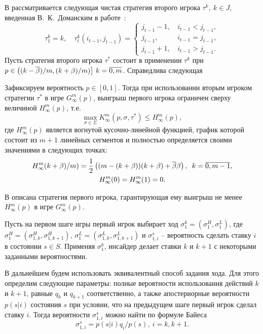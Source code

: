 В  рассматривается следующая чистая стратегия второго игрока $\tau^k,\ k \in J$, введенная В.~К.~Доманским в работе~\cite{domansky07}:
\[
  \tau^k_1 = k, \quad \tau^k_t(i_{t-1}, j_{t-1}) = \begin{cases}
    j_{t-1} - 1, & \, i_{t-1} < j_{t-1}, \\
    j_{t-1},     & \, i_{t-1} = j_{t-1}, \\
    j_{t-1} + 1, & \, i_{t-1} > j_{t-1}.
  \end{cases}
\]
Пусть стратегия второго игрока $\tau^*$ состоит в применении $\tau^k$ при $p \in \left( (k-{\overline{\beta}})/m, (k+\beta)/m) \right]\, k = \overline{0, m}$.
Справедлива следующая
\begin{theorem}
  Зафиксируем вероятность $p \in [0,1]$.
  Тогда при использовании вторым игроком стратегии $\tau^*$ в игре $G^m_\infty(p)$\textup{,} выигрыш первого игрока ограничен сверху величиной $H^m_\infty(p)$, т.е.
  \[
    \max_{\sigma \in \Sigma} K^m_\infty(p,\sigma,\tau^*) \leqslant H^m_\infty(p),
  \]
  где $H^m_\infty(p)$ является вогнутой кусочно-линейной функцией, график которой состоит из $m+1$ линейных сегментов и полностью определяется своими значениями в следующих точках:
  \begin{gather*}
    H^m_\infty(k+\beta)/m) = \frac{1}{2} \left( (m - (k + \beta))(k + \beta) + {\overline{\beta}}\beta \right),\enskip
    k = \overline{0, m - 1},\\
    H^m_\infty(0) = H^m_\infty(1) = 0.
  \end{gather*}
\end{theorem}

В  описана стратегия первого игрока, гарантирующая ему выигрыш не менее $H^m_\infty(p)$ в игре $G^m_\infty(p)$.

Пусть на первом шаге игры первый игрок выбирает ход %
$\sigma^k_1 = (\sigma^H_1, \sigma^L_1)$, где %
$\sigma^H_1 = (\sigma^H_{1,k}, \sigma^H_{1,k+1})$,
$\sigma^L_1 = (\sigma^L_{1,k}, \sigma^L_{1,k+1})$ и
$\sigma^s_{1,i}$ -- вероятность сделать ставку $i$ в состоянии $s \in S$.
Применяя $\sigma^k_1$, инсайдер делает ставки $k$ и $k+1$ с некоторыми заданными вероятностями.

В дальнейшем будем использовать эквивалентный способ задания хода.
Для этого определим следующие параметры: полные вероятности использования действий $k$ и $k+1$, равные $q_k$ и $q_{k+1}$ соответственно, а также апостериорные вероятности $p(s|i)$ состояния $s$ при условии, что на предыдущем шаге первый игрок сделал ставку $i$.
Тогда вероятности $\sigma^s_{1,i}$ можно найти по формуле Байеса
\[
  \sigma^s_{1,i} = p(s|i)q_i/p(s), \: i = k, k + 1.
\]

